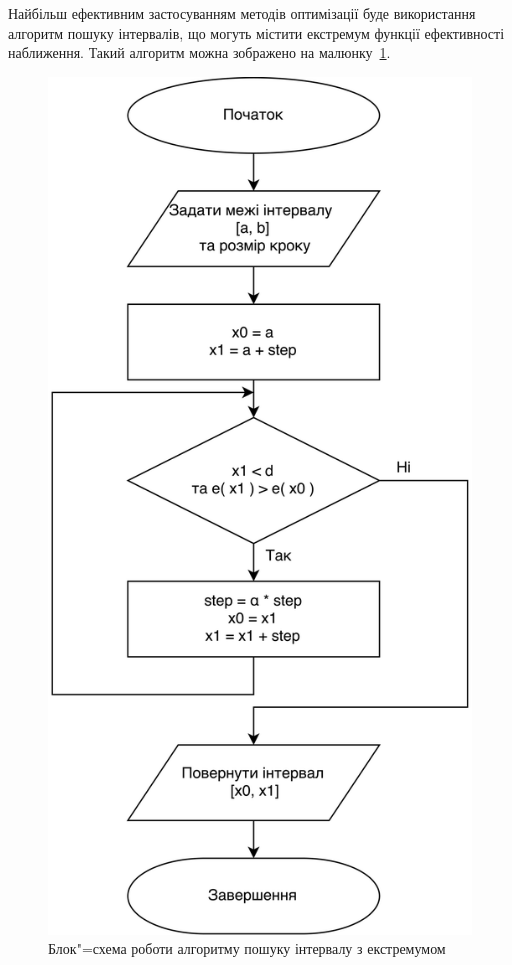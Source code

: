         Найбільш ефективним застосуванням методів оптимізації буде використання алгоритм пошуку інтервалів, що могуть
        містити екстремум функції ефективності наближення.
        Такий алгоритм можна зображено на малюнку~\ref{fig:svenn-algorithm}.

        \begin{figure}[!h]
            \centering
            \includegraphics[height=0.85\textheight]{svenn.eps}
            \caption{Блок"=схема роботи алгоритму пошуку інтервалу з екстремумом}
            \label{fig:svenn-algorithm}
        \end{figure}

